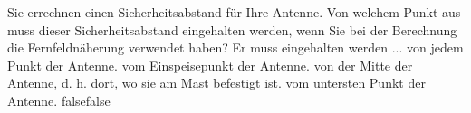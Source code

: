    {Sie errechnen einen Sicherheitsabstand für Ihre Antenne. Von welchem Punkt aus muss dieser Sicherheitsabstand eingehalten werden, wenn Sie bei der Berechnung die Fernfeldnäherung verwendet haben? Er muss eingehalten werden ...}
    {von jedem Punkt der Antenne.}
    {vom Einspeisepunkt der Antenne.}
    {von der Mitte der Antenne, d. h. dort, wo sie am Mast befestigt ist.}
    {vom untersten Punkt der Antenne.}
    {false}{false}